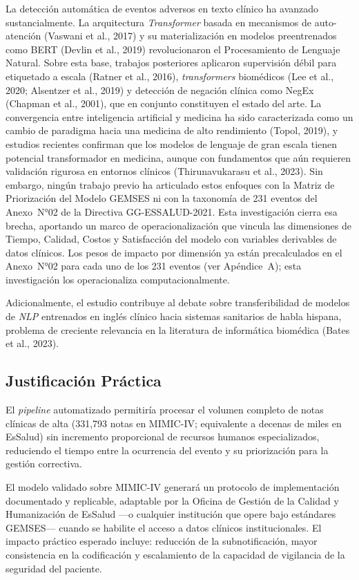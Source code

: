 \documentclass[12pt,a4paper,oneside]{book}
\begin{document}
La detección automática de eventos adversos en texto clínico ha avanzado sustancialmente. La arquitectura \textit{Transformer} basada en mecanismos de auto-atención (Vaswani et al., 2017) y su materialización en modelos preentrenados como BERT (Devlin et al., 2019) revolucionaron el Procesamiento de Lenguaje Natural. Sobre esta base, trabajos posteriores aplicaron supervisión débil para etiquetado a escala (Ratner et al., 2016), \textit{transformers} biomédicos (Lee et al., 2020; Alsentzer et al., 2019) y detección de negación clínica como NegEx (Chapman et al., 2001), que en conjunto constituyen el estado del arte. La convergencia entre inteligencia artificial y medicina ha sido caracterizada como un cambio de paradigma hacia una medicina de alto rendimiento (Topol, 2019), y estudios recientes confirman que los modelos de lenguaje de gran escala tienen potencial transformador en medicina, aunque con fundamentos que aún requieren validación rigurosa en entornos clínicos (Thirunavukarasu et al., 2023). Sin embargo, ningún trabajo previo ha articulado estos enfoques con la Matriz de Priorización del Modelo GEMSES ni con la taxonomía de 231 eventos del Anexo~N°02 de la Directiva GG-ESSALUD-2021. Esta investigación cierra esa brecha, aportando un marco de operacionalización que vincula las dimensiones de Tiempo, Calidad, Costos y Satisfacción del modelo con variables derivables de datos clínicos. Los pesos de impacto por dimensión ya están precalculados en el Anexo~N°02 para cada uno de los 231 eventos (ver Apéndice~A); esta investigación los operacionaliza computacionalmente.

Adicionalmente, el estudio contribuye al debate sobre transferibilidad de modelos de \textit{NLP} entrenados en inglés clínico hacia sistemas sanitarios de habla hispana, problema de creciente relevancia en la literatura de informática biomédica (Bates et al., 2023).

\subsection{Justificación Práctica}

El \textit{pipeline} automatizado permitiría procesar el volumen completo de notas clínicas de alta (331{,}793 notas en MIMIC-IV; equivalente a decenas de miles en EsSalud) sin incremento proporcional de recursos humanos especializados, reduciendo el tiempo entre la ocurrencia del evento y su priorización para la gestión correctiva.

El modelo validado sobre MIMIC-IV generará un protocolo de implementación documentado y replicable, adaptable por la Oficina de Gestión de la Calidad y Humanización de EsSalud ---o cualquier institución que opere bajo estándares GEMSES--- cuando se habilite el acceso a datos clínicos institucionales. El impacto práctico esperado incluye: reducción de la subnotificación, mayor consistencia en la codificación y escalamiento de la capacidad de vigilancia de la seguridad del paciente.
\end{document}
